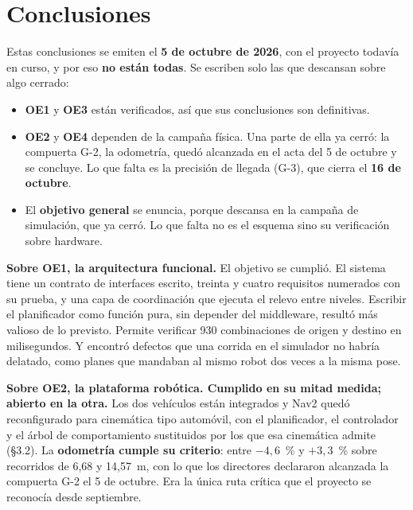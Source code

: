 \chapter*{Conclusiones}

\begin{notaavance}
Estas conclusiones se emiten el \textbf{5 de octubre de 2026}, con el proyecto
todavía en curso, y por eso \textbf{no están todas}. Se escriben solo las que
descansan sobre algo cerrado:

\begin{itemize}[leftmargin=*,nosep]
  \item \textbf{OE1} y \textbf{OE3} están verificados, así que sus
    conclusiones son definitivas.
  \item \textbf{OE2} y \textbf{OE4} dependen de la campaña física. Una parte
    de ella ya cerró: la compuerta G-2, la odometría, quedó alcanzada en el acta
    del 5 de octubre y se concluye. Lo que falta es la precisión de llegada
    (G-3), que cierra el \textbf{16 de octubre}.
  \item El \textbf{objetivo general} se enuncia, porque descansa en la campaña
    de simulación, que ya cerró. Lo que falta no es el esquema sino su
    verificación sobre hardware.
\end{itemize}
\end{notaavance}

\textbf{Sobre OE1, la arquitectura funcional.} El objetivo se cumplió. El sistema
tiene un contrato de interfaces escrito, treinta y cuatro requisitos numerados con
su prueba, y una capa de coordinación que ejecuta el relevo entre niveles. Escribir el
planificador como función pura, sin depender del middleware, resultó más valioso
de lo previsto. Permite verificar 930 combinaciones de origen y destino en
milisegundos. Y encontró defectos que una corrida en el simulador no habría
delatado, como planes que mandaban al mismo robot dos veces a la misma pose.

\textbf{Sobre OE2, la plataforma robótica. Cumplido en su mitad medida;
abierto en la otra.} Los dos vehículos están integrados y Nav2 quedó
reconfigurado para cinemática tipo automóvil, con el planificador, el controlador
y el árbol de comportamiento sustituidos por los que esa cinemática admite
(§3.2). La \textbf{odometría cumple su criterio}: entre $-4{,}6$~\% y
$+3{,}3$~\% sobre recorridos de 6,68 y 14,57~m, con lo que los directores
declararon alcanzada la compuerta G-2 el 5 de octubre. Era la única ruta crítica
que el proyecto se reconocía desde septiembre.

